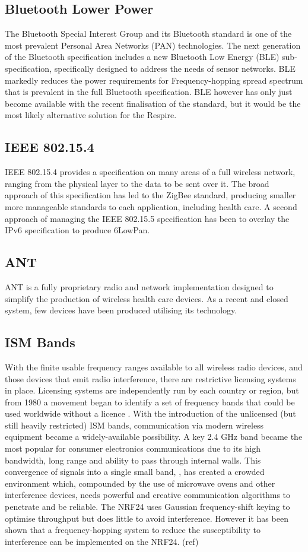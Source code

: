 \subsection{Bluetooth Lower Power}
The Bluetooth Special Interest Group and its Bluetooth standard is one of the most prevalent
Personal Area Networks (PAN) technologies. The next generation of the Bluetooth specification
includes a new Bluetooth Low Energy (BLE) sub-specification, specifically designed to address the
needs of sensor networks. BLE markedly reduces the power requirements for Frequency-hopping
spread spectrum that is prevalent in the full Bluetooth specification. BLE however has only just
become available with the recent finalisation of the standard, but it would be the most likely
alternative solution for the Respire.


\subsection{IEEE 802.15.4}
IEEE 802.15.4 provides a specification on many areas of a full wireless network, ranging from the
physical layer to the data to be sent over it. The broad approach of this specification has led to the
ZigBee standard, producing smaller more manageable standards to each application, including
health care. A second approach of managing the IEEE 802.15.5 specification has been to overlay the
IPv6 specification to produce 6LowPan.


\subsection{ANT}
ANT is a fully proprietary radio and network implementation designed to simplify the production of
wireless health care devices. As a recent and closed system, few devices have been produced
utilising its technology.


\subsection{\acf{ISM} Bands}
With the finite usable frequency ranges available to all wireless radio devices, and those devices that
emit radio interference, there are restrictive licensing systems in place. Licensing systems are
independently run by each country or region, but from 1980 a movement began to identify a set of
frequency bands that could be used worldwide without a licence \cite{ISMGen}.
With the introduction of the unlicensed (but still heavily restricted) \ac{ISM} bands,
communication via modern wireless equipment became a
widely-available possibility. A key 2.4 GHz band became the most popular for consumer electronics
communications due to its high bandwidth, long range and ability to pass through internal walls. This
convergence of signals into a single small band, , has created a crowded environment which,
compounded by the use of microwave ovens and other interference devices, needs powerful and
creative communication algorithms to penetrate and be reliable. The NRF24 uses Gaussian
frequency-shift keying to optimise throughput but does little to avoid interference. However it has
been shown that a frequency-hopping system to reduce the susceptibility to interference can be
implemented on the NRF24. (ref)


